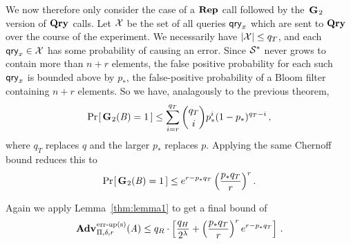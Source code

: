 We now therefore only consider the case of a $\textup{\textbf{Rep}}\hspace{0.5pt}$ call followed by the~$\textup{\textbf{G}}\hspace{0.5pt}_2$ version of $\textup{\textbf{Qry}}\hspace{0.5pt}$ calls. Let $\mathcal{X}$ be the set of all queries $\mathsf{qry}_x$ which are sent to $\textup{\textbf{Qry}}\hspace{0.5pt}$ over the course of the experiment. We necessarily have $|\mathcal{X}| \le q_T$, and each $\mathsf{qry}_x \in \mathcal{X}$ has some probability of causing an error. Since $\mathcal{S}^*$ never grows to contain more than $n+r$ elements, the false positive probability for each such $\mathsf{qry}_x$ is bounded above by $p_*$, the false-positive probability of a Bloom filter containing $n+r$ elements. So we have, analagously to the previous theorem,
\begin{equation}
   \Pr\hspace{-1pt}\left[\,\textup{\textbf{G}}\hspace{0.5pt}_2(\mathit{B})=1\,\right] \le
     \sum_{i=r}^{q_T} \binom{q_T}{i}p_*^i(1-p_*)^{q_T-i} \,,
\end{equation}
where $q_T$ replaces $q$ and the larger $p_*$ replaces $p$. Applying the same Chernoff bound reduces this to
\begin{equation}
   \Pr\hspace{-1pt}\left[\,\textup{\textbf{G}}\hspace{0.5pt}_2(\mathit{B})=1\,\right] \le
     e^{r-p_*q_T}\left(\frac{p_*q_T}{r}\right)^r.
\end{equation}

Again we apply Lemma~\ref{thm:lemma1} to get a final bound of
\begin{equation}
  \Adv{\erreps}_{\Pi,\delta,r}(\advA) \leq
    q_R \cdot \left[
      \frac{q_H}{2^\lambda} +
      \left(\frac{p_*q_T}{r}\right)^re^{r-p_*q_T}
    \right] \,.
\end{equation}